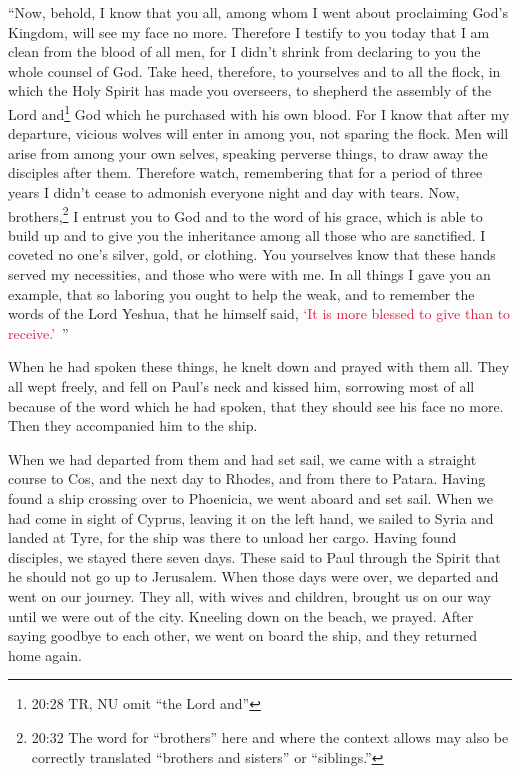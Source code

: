 \myverse{}“Now, behold, I know that you all, among whom I went about proclaiming
God’s Kingdom, will see my face no more.
\myverse{}Therefore I testify to you today that I am clean from the blood of all men,
\myverse{}for I didn’t shrink from declaring to you the whole counsel of God.
\myverse{}Take heed, therefore, to yourselves and to all the flock, in which the Holy
Spirit has made you overseers, to shepherd the assembly of the Lord and\footnote{20:28 TR, NU omit “the Lord and”} God which he purchased with his own blood.
\myverse{}For I know that after my departure, vicious wolves will enter in among you,
not sparing the flock.
\myverse{}Men will arise from among your own selves, speaking perverse things, to draw
away the disciples after them.
\myverse{}Therefore watch, remembering that for a period of three years I didn’t cease
to admonish everyone night and day with tears.
\myverse{}Now, brothers,\footnote{20:32 The word for “brothers” here and where the context allows may also be correctly translated “brothers
	and sisters” or “siblings.”
} I entrust you to God and to the word of his grace, which is able to build up and to give you
the inheritance among all those who are sanctified.
\myverse{}I coveted no one’s silver, gold, or clothing.
\myverse{}You yourselves know that these hands served my necessities, and those who
were with me.
\myverse{}In all things I gave you an example, that so laboring you ought to help the
weak, and to remember the words of the Lord Yeshua, that he himself said,
\textcolor{crimson}{‘It is more blessed to give than to receive.’} ”

\myverse{}When he had spoken these things, he knelt down and prayed with
them all.
\myverse{}They all wept freely, and fell on Paul’s neck and kissed him,
\myverse{}sorrowing most of all because of the word which he had spoken, that they
should see his face no more. Then they accompanied him to the ship.


\mychapter{} \myverse*{}When we had departed from them and had set sail, we came with
a straight course to Cos, and the next day to Rhodes, and from there to Patara.
\myverse{}Having found a ship crossing over to Phoenicia, we went aboard and set sail.
\myverse{}When we had come in sight of Cyprus, leaving it on the left hand, we sailed
to Syria and landed at Tyre, for the ship was there to unload her cargo.
\myverse{}Having found disciples, we stayed there seven days. These said to Paul through
the Spirit that he should not go up to Jerusalem.
\myverse{}When those days were over, we departed and went on our journey. They all, with
wives and children, brought us on our way until we were out of the city. Kneeling down on the beach, we
prayed.
\myverse{}After saying goodbye to each other, we went on board the ship, and they returned
home again.

